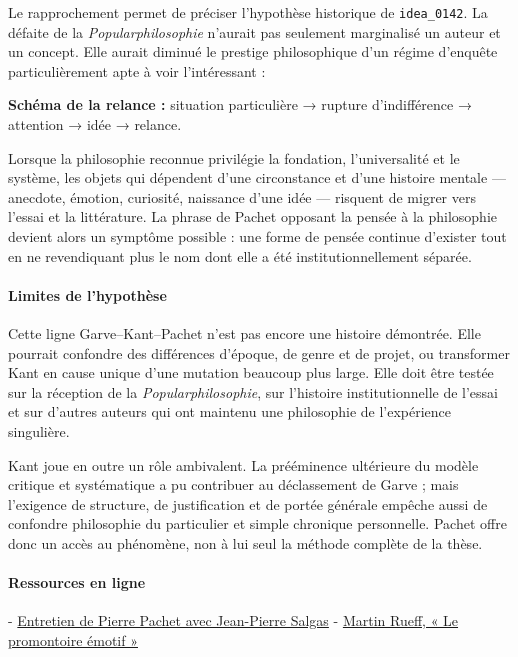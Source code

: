 \documentclass[10pt,a4paper]{article}
\begin{document}
Le rapprochement permet de préciser l'hypothèse historique de \texttt{idea\_0142}. La défaite de la \emph{Popularphilosophie} n'aurait pas seulement marginalisé un auteur et un concept. Elle aurait diminué le prestige philosophique d'un régime d'enquête particulièrement apte à voir l'intéressant :

\textbf{Schéma de la relance :} situation particulière → rupture d'indifférence → attention → idée → relance.

Lorsque la philosophie reconnue privilégie la fondation, l'universalité et le système, les objets qui dépendent d'une circonstance et d'une histoire mentale — anecdote, émotion, curiosité, naissance d'une idée — risquent de migrer vers l'essai et la littérature. La phrase de Pachet opposant la pensée à la philosophie devient alors un symptôme possible : une forme de pensée continue d'exister tout en ne revendiquant plus le nom dont elle a été institutionnellement séparée.

\paragraph{Limites de l'hypothèse}
Cette ligne Garve–Kant–Pachet n'est pas encore une histoire démontrée. Elle pourrait confondre des différences d'époque, de genre et de projet, ou transformer Kant en cause unique d'une mutation beaucoup plus large. Elle doit être testée sur la réception de la \emph{Popularphilosophie}, sur l'histoire institutionnelle de l'essai et sur d'autres auteurs qui ont maintenu une philosophie de l'expérience singulière.

Kant joue en outre un rôle ambivalent. La prééminence ultérieure du modèle critique et systématique a pu contribuer au déclassement de Garve ; mais l'exigence de structure, de justification et de portée générale empêche aussi de confondre philosophie du particulier et simple chronique personnelle. Pachet offre donc un accès au phénomène, non à lui seul la méthode complète de la thèse.

\paragraph{Ressources en ligne}
- \href{\detokenize{https://jeanpierresalgas.fr/pierre-pachet-je-suis-persuade-que-meme-maldoror-cache-un-temoignage/}}{Entretien de Pierre Pachet avec Jean-Pierre Salgas} - \href{\detokenize{https://www.en-attendant-nadeau.fr/2016/07/10/promontoire-pachet-rueff/}}{Martin Rueff, « Le promontoire émotif »}
\end{document}

